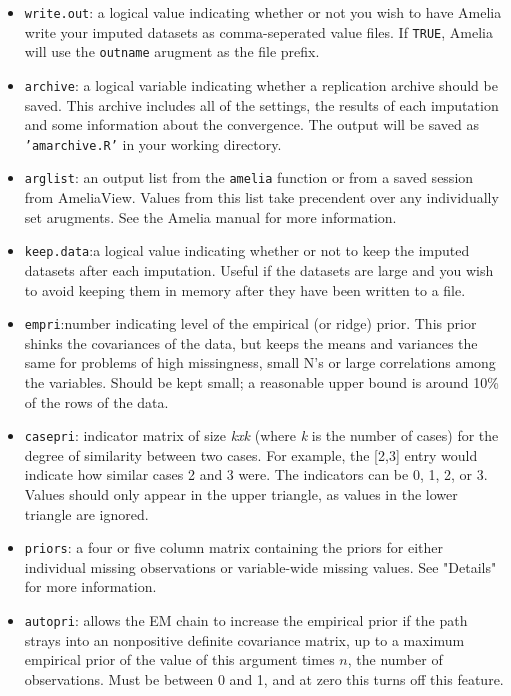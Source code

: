 \documentclass[12pt,titlepage]{article}
\begin{document}
\begin{itemize}
  \item \texttt{write.out}: a logical value indicating whether or not you wish to have Amelia write your imputed datasets as comma-seperated value files.
    If \texttt{TRUE}, Amelia will use the \texttt{outname} arugment as the
    file prefix.

  \item \texttt{archive}: a logical variable indicating whether a replication archive should be saved.  This archive includes all of the settings, the results
    of each imputation and some information about the convergence.  The
    output will be saved as \texttt{'amarchive.R'} in your working directory.

  \item \texttt{arglist}: an output list from the \texttt{amelia} function or from
    a saved session from AmeliaView.  Values from this list take precendent
    over any individually set arugments.   See the Amelia manual for more
    information.

  \item \texttt{keep.data}:a logical value indicating whether or not to keep the
    imputed datasets after each imputation.  Useful if the datasets are
    large and you wish to avoid keeping them in memory after they have been
    written to a file.

  \item \texttt{empri}:number indicating level of the empirical (or ridge) prior. This prior shinks the covariances of the data, but keeps the means
    and variances the same for problems of high missingness, small N's or
    large correlations among the variables.  Should be kept small; a 
    reasonable upper bound is around 10\% of the rows of the data.

  \item \texttt{casepri}: indicator matrix of size \emph{kxk} (where \emph{k} is 
    the number of cases) for the degree of similarity between two cases.  
    For example, the [2,3] entry would indicate how similar cases 2 and 3 
    were.  The indicators can be 0, 1, 2, or 3.  Values should only appear
    in the upper triangle, as values in the lower triangle are ignored.

  \item \texttt{priors}: a four or five column matrix containing the priors for
    either individual missing observations or variable-wide missing
    values.  See "Details" for more information.

  \item \texttt{autopri}:  allows the EM chain to increase the empirical prior if the path strays into an nonpositive definite covariance matrix, up to a maximum empirical prior of the value of this argument times $n$, the number of observations.  Must be between 0 and 1, and at zero this turns off this feature. 

    \end{itemize}
\end{document}
